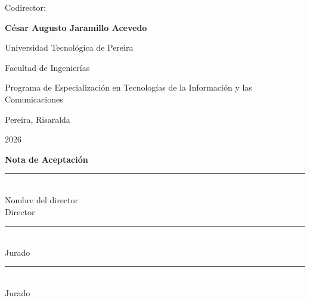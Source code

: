 \begin{titlepage}
\begin{center}
\vspace{0.55cm}

Codirector:

\vspace{0.20cm}

{\large\bfseries
César Augusto Jaramillo Acevedo
}

\vfill

{\large Universidad Tecnológica de Pereira}

\vspace{0.15cm}

Facultad de Ingenierías

\vspace{0.15cm}

Programa de Especialización en Tecnologías de la Información y las Comunicaciones

\vspace{0.15cm}

Pereira, Risaralda

\vspace{0.15cm}

2026

\end{center}

\restoregeometry
\end{titlepage}


\cleardoublepage
\thispagestyle{empty}

\vspace*{3.0cm}

\begin{center}
{\Large\bfseries Nota de Aceptación}
\end{center}

\vspace{3.0cm}

\begin{flushright}
\rule{8cm}{0.4pt}\\
Nombre del director\\
Director

\vspace{1.8cm}

\rule{8cm}{0.4pt}\\
Jurado

\vspace{1.8cm}

\rule{8cm}{0.4pt}\\
Jurado
\end{flushright}

